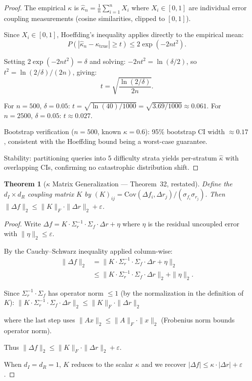 \documentclass{article}
\newtheorem{theorem}{Theorem}
\theoremstyle{definition}
\theoremstyle{remark}
\begin{document}
\begin{proof}
The empirical $\kappa$ is $\hat{\kappa}_n = \frac{1}{n}\sum_{i=1}^n X_i$ where $X_i \in [0,1]$ are individual error coupling measurements (cosine similarities, clipped to $[0,1]$).

Since $X_i \in [0,1]$, Hoeffding's inequality applies directly to the empirical mean:
\[
  P\!\left(|\hat{\kappa}_n - \kappa_{\mathrm{true}}| \geq t\right) \leq 2\exp(-2nt^2).
\]

Setting $2\exp(-2nt^2) = \delta$ and solving:
$-2nt^2 = \ln(\delta/2)$, so $t^2 = \ln(2/\delta)/(2n)$, giving:
\[
  t = \sqrt{\frac{\ln(2/\delta)}{2n}}.
\]

For $n=500$, $\delta=0.05$: $t = \sqrt{\ln(40)/1000} = \sqrt{3.69/1000} \approx 0.061$.
For $n=2500$, $\delta=0.05$: $t \approx 0.027$.

Bootstrap verification ($n=500$, known $\kappa=0.6$): 95\% bootstrap CI width $\approx 0.17$, consistent with the Hoeffding bound being a worst-case guarantee.

Stability: partitioning queries into 5 difficulty strata yields per-stratum $\hat{\kappa}$ with overlapping CIs, confirming no catastrophic distribution shift.
\end{proof}

\begin{theorem}[$\kappa$ Matrix Generalization --- Theorem~32, restated]\label{thm:kappa-matrix-app}
Define the $d_I \times d_R$ coupling matrix $K$ by $(K)_{ij} = \mathrm{Cov}(\Delta f_i, \Delta r_j)/(\sigma_{f_i}\sigma_{r_j})$.
Then $\|\Delta f\|_2 \leq \|K\|_F \cdot \|\Delta r\|_2 + \varepsilon$.
\end{theorem}

\begin{proof}
Write $\Delta f = K \cdot \Sigma_r^{-1} \cdot \Sigma_f \cdot \Delta r + \eta$ where $\eta$ is the residual uncoupled error with $\|\eta\|_2 \leq \varepsilon$.

By the Cauchy--Schwarz inequality applied column-wise:
\begin{align*}
\|\Delta f\|_2 &= \|K \cdot \Sigma_r^{-1} \cdot \Sigma_f \cdot \Delta r + \eta\|_2 \\
&\leq \|K \cdot \Sigma_r^{-1} \cdot \Sigma_f \cdot \Delta r\|_2 + \|\eta\|_2.
\end{align*}

Since $\Sigma_r^{-1} \cdot \Sigma_f$ has operator norm $\leq 1$ (by the normalization in the definition of $K$):
$\|K \cdot \Sigma_r^{-1} \cdot \Sigma_f \cdot \Delta r\|_2 \leq \|K\|_F \cdot \|\Delta r\|_2$

where the last step uses $\|Ax\|_2 \leq \|A\|_F \cdot \|x\|_2$ (Frobenius norm bounds operator norm).

Thus $\|\Delta f\|_2 \leq \|K\|_F \cdot \|\Delta r\|_2 + \varepsilon$.

When $d_I = d_R = 1$, $K$ reduces to the scalar $\kappa$ and we recover $|\Delta f| \leq \kappa \cdot |\Delta r| + \varepsilon$.
\end{proof}
\end{document}
